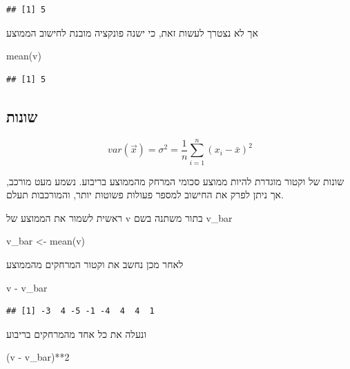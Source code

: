 \documentclass[
]{book}
\newenvironment{Shaded}{\begin{snugshade}}{\end{snugshade}}
\newcommand{\DecValTok}[1]{\textcolor[rgb]{0.00,0.00,0.81}{#1}}
\newcommand{\FunctionTok}[1]{\textcolor[rgb]{0.00,0.00,0.00}{#1}}
\newcommand{\NormalTok}[1]{#1}
\newcommand{\OtherTok}[1]{\textcolor[rgb]{0.56,0.35,0.01}{#1}}
\newcommand{\SpecialCharTok}[1]{\textcolor[rgb]{0.00,0.00,0.00}{#1}}
\begin{document}
\begin{verbatim}
## [1] 5
\end{verbatim}

אך לא נצטרך לעשות זאת, כי ישנה פונקציה מובנת לחישוב הממוצע

\begin{Shaded}
\begin{Highlighting}[]
\FunctionTok{mean}\NormalTok{(v)}
\end{Highlighting}
\end{Shaded}

\begin{verbatim}
## [1] 5
\end{verbatim}

\hypertarget{ux5e9ux5d5ux5e0ux5d5ux5ea}{%
\subsection{שונות}\label{ux5e9ux5d5ux5e0ux5d5ux5ea}}

\[
var(\vec x) = \sigma^2 = \frac{1}{n} \sum_{i = 1}^n (x_i - \bar x)^2
\]

שונות של וקטור מוגדרת להיות ממוצע סכומי המרחק מהממוצע בריבוע. נשמע מעט מורכב, אך ניתן לפרק את החישוב למספר פעולות פשוטות יותר, והמורכבות תעלם.

ראשית לשמור את הממוצע של
v
בתור משתנה בשם
v\_bar

\begin{Shaded}
\begin{Highlighting}[]
\NormalTok{v\_bar }\OtherTok{\textless{}{-}} \FunctionTok{mean}\NormalTok{(v)}
\end{Highlighting}
\end{Shaded}

לאחר מכן נחשב את וקטור המרחקים מהממוצע

\begin{Shaded}
\begin{Highlighting}[]
\NormalTok{v }\SpecialCharTok{{-}}\NormalTok{ v\_bar}
\end{Highlighting}
\end{Shaded}

\begin{verbatim}
## [1] -3  4 -5 -1 -4  4  4  1
\end{verbatim}

ונעלה את כל אחד מהמרחקים בריבוע

\begin{Shaded}
\begin{Highlighting}[]
\NormalTok{(v }\SpecialCharTok{{-}}\NormalTok{ v\_bar)}\SpecialCharTok{**}\DecValTok{2}
\end{Highlighting}
\end{Shaded}
\end{document}
